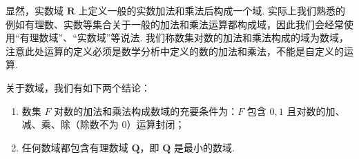 显然，实数域 $\mathbf{R}$ 上定义一般的实数加法和乘法后构成一个域. 实际上我们熟悉的例如有理数、实数等集合关于一般的加法和乘法运算都构成域，因此我们会经常使用``有理数域''、``实数域''等说法. 我们称数集对数的加法和乘法构成的域为数域，注意此处运算的定义必须是数学分析中定义的数的加法和乘法，不能是自定义的运算.

\begin{theorem}{}{}
    关于数域，我们有如下两个结论：
    \begin{enumerate}
        \item 数集 $F$ 对数的加法和乘法构成数域的充要条件为：$F$ 包含 $0,1$ 且对数的加、减、乘、除（除数不为 $0$）运算封闭；

        \item 任何数域都包含有理数域 $\mathbf{Q}$，即 $\mathbf{Q}$ 是最小的数域.
    \end{enumerate}
\end{theorem}

